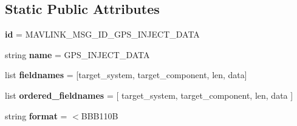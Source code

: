\subsection*{Static Public Attributes}
\begin{DoxyCompactItemize}
\item 
\mbox{\label{classpymavlink_1_1dialects_1_1v10_1_1MAVLink__gps__inject__data__message_a66560e2f1108726bb175ca97da8ac262}} 
{\bfseries id} = M\+A\+V\+L\+I\+N\+K\+\_\+\+M\+S\+G\+\_\+\+I\+D\+\_\+\+G\+P\+S\+\_\+\+I\+N\+J\+E\+C\+T\+\_\+\+D\+A\+TA
\item 
\mbox{\label{classpymavlink_1_1dialects_1_1v10_1_1MAVLink__gps__inject__data__message_aad852edea45c26f48ee684f40a2d88a3}} 
string {\bfseries name} = \textquotesingle{}G\+P\+S\+\_\+\+I\+N\+J\+E\+C\+T\+\_\+\+D\+A\+TA\textquotesingle{}
\item 
\mbox{\label{classpymavlink_1_1dialects_1_1v10_1_1MAVLink__gps__inject__data__message_acb8c257c6c27116b58836ccc301fd6f4}} 
list {\bfseries fieldnames} = \mbox{[}\textquotesingle{}target\+\_\+system\textquotesingle{}, \textquotesingle{}target\+\_\+component\textquotesingle{}, \textquotesingle{}len\textquotesingle{}, \textquotesingle{}data\textquotesingle{}\mbox{]}
\item 
\mbox{\label{classpymavlink_1_1dialects_1_1v10_1_1MAVLink__gps__inject__data__message_a04c69182fd0f616967d8fb3b50f073c9}} 
list {\bfseries ordered\+\_\+fieldnames} = \mbox{[} \textquotesingle{}target\+\_\+system\textquotesingle{}, \textquotesingle{}target\+\_\+component\textquotesingle{}, \textquotesingle{}len\textquotesingle{}, \textquotesingle{}data\textquotesingle{} \mbox{]}
\item 
\mbox{\label{classpymavlink_1_1dialects_1_1v10_1_1MAVLink__gps__inject__data__message_a904eb489369277d72a88b83087324ce9}} 
string {\bfseries format} = \textquotesingle{}$<$B\+B\+B110B\textquotesingle{}
\item 
\mbox{\label{classpymavlink_1_1dialects_1_1v10_1_1MAVLink__gps__inject__data__message_a56931a643a61e849778c5b3a3957e491}} 

\end{DoxyCompactItemize}
